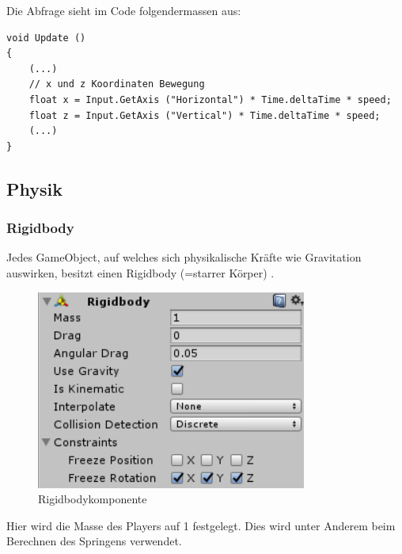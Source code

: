 Die Abfrage sieht im Code folgendermassen aus:

\begin{lstlisting}[caption={Abfrage der X- und Z-Achsen im Code}]
void Update ()
{
	(...)
	// x und z Koordinaten Bewegung
	float x = Input.GetAxis ("Horizontal") * Time.deltaTime * speed;
	float z = Input.GetAxis ("Vertical") * Time.deltaTime * speed;
	(...)
}      
\end{lstlisting}

\subsection{Physik}

\subsubsection{Rigidbody}
Jedes GameObject, auf welches sich physikalische Kräfte wie Gravitation auswirken, besitzt einen Rigidbody (=starrer Körper) .
\begin{figure}[H]
\includegraphics[scale=0.8]{screenshots/rigidbody.png}
\caption{Rigidbodykomponente}
\end{figure}
\noindent Hier wird die Masse des Players auf 1 festgelegt. Dies wird unter Anderem beim Berechnen des Springens verwendet.

